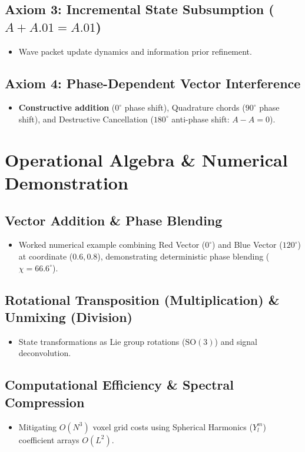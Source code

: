 \documentclass[12pt, a4paper]{article}
\begin{document}
\subsection{Axiom 3: Incremental State Subsumption ($A + A.01 = A.01$)}
\begin{itemize}
    \item Wave packet update dynamics and information prior refinement.
\end{itemize}

\subsection{Axiom 4: Phase-Dependent Vector Interference}
\begin{itemize}
    \item \textbf{Constructive addition} ($0^\circ$ phase shift), Quadrature chords ($90^\circ$ phase shift), and Destructive Cancellation ($180^\circ$ anti-phase shift: $A - A = 0$).
\end{itemize}

\section{Operational Algebra \& Numerical Demonstration}
\subsection{Vector Addition \& Phase Blending}
\begin{itemize}
    \item Worked numerical example combining Red Vector ($0^\circ$) and Blue Vector ($120^\circ$) at coordinate ($0.6, 0.8$), demonstrating deterministic phase blending ($\chi = 66.6^\circ$).
\end{itemize}

\subsection{Rotational Transposition (Multiplication) \& Unmixing (Division)}
\begin{itemize}
    \item State transformations as Lie group rotations ($\mathrm{SO}(3)$) and signal deconvolution.
\end{itemize}

\subsection{Computational Efficiency \& Spectral Compression}
\begin{itemize}
    \item Mitigating $O(N^3)$ voxel grid costs using Spherical Harmonics ($Y_l^m$) coefficient arrays $O(L^2)$.
\end{itemize}
\end{document}
